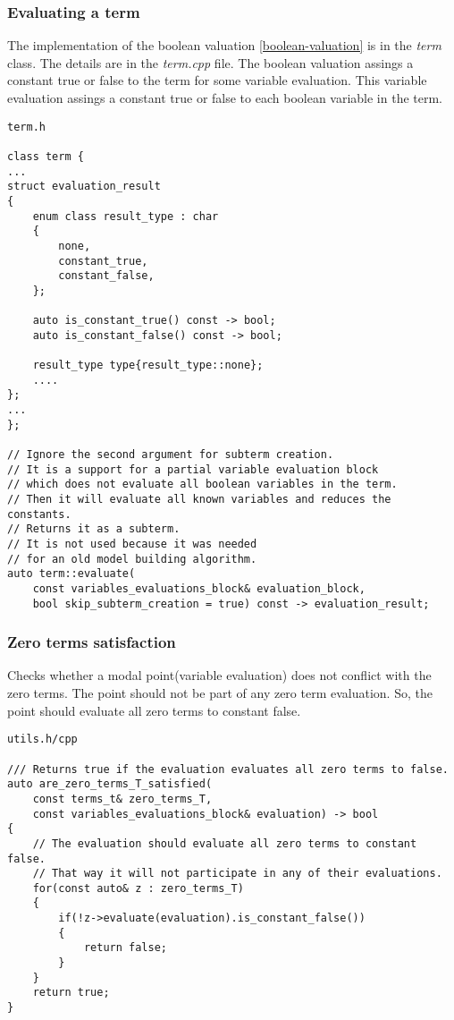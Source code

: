 \documentclass{article}
\begin{document}
	\newpage
	\subsubsection*{Evaluating a term}
	The implementation of the boolean valuation \ref{boolean-valuation} is in the \textit{term} class. The details are in the \textit{term.cpp} file.
	The boolean valuation assings a constant true or false to the term for some variable evaluation. This variable evaluation assings a constant true or false to each boolean variable in the term.
\\
\begin{lstlisting}
term.h

class term {
...
struct evaluation_result
{
    enum class result_type : char
    {
        none,
        constant_true,
        constant_false,
    };

    auto is_constant_true() const -> bool;
    auto is_constant_false() const -> bool;

    result_type type{result_type::none};
	....
};
...
};

// Ignore the second argument for subterm creation.
// It is a support for a partial variable evaluation block
// which does not evaluate all boolean variables in the term.
// Then it will evaluate all known variables and reduces the constants.
// Returns it as a subterm.
// It is not used because it was needed
// for an old model building algorithm.
auto term::evaluate(
	const variables_evaluations_block& evaluation_block,
	bool skip_subterm_creation = true) const -> evaluation_result;
\end{lstlisting}

	\newpage
	\subsubsection*{Zero terms satisfaction}
	Checks whether a modal point(variable evaluation) does not conflict with the zero terms. The point should not be part of any zero term evaluation. So, the point should evaluate all zero terms to constant false.
\\
\begin{lstlisting}
utils.h/cpp

/// Returns true if the evaluation evaluates all zero terms to false.
auto are_zero_terms_T_satisfied(
	const terms_t& zero_terms_T,
	const variables_evaluations_block& evaluation) -> bool
{
    // The evaluation should evaluate all zero terms to constant false.
    // That way it will not participate in any of their evaluations.
    for(const auto& z : zero_terms_T)
    {
        if(!z->evaluate(evaluation).is_constant_false())
        {
            return false;
        }
    }
    return true;
}
\end{lstlisting}
\end{document}
